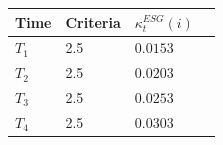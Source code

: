 \begin{center}
    \begin{tabular}{ | l | l | l | p{5cm} |}
    \hline
    Time    & Criteria  & $\kappa_{t}^{ESG}(i)$ \\ \hline
    $T_{1}$ &    2.5    & $0.0153$  \\ \hline
    $T_{2}$ &    2.5    & $0.0203$  \\ \hline
    $T_{3}$ &    2.5    & $0.0253$\\ \hline
    $T_{4}$ &    2.5    & $0.0303$ \\ \hline
    \end{tabular}
\end{center} 











